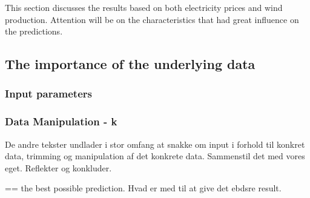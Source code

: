This section discusses the results based on both electricity prices and wind production. Attention will be on the characteristics that had great influence on the predictions.  

\subsection{The importance of the underlying data}

\subsubsection{Input parameters}

\subsubsection{Data Manipulation - k}
De andre tekster undlader i stor omfang at snakke om input i forhold til konkret data, trimming og manipulation af det konkrete data. Sammenstil det med vores eget. Reflekter og konkluder.

== the best possible prediction. Hvad er med til at give det ebdsre result.